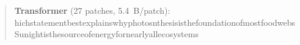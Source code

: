 \begin{quote}\footnotesize\ttfamily\raggedright\setlength{\emergencystretch}{3em}
\textbf{Transformer} (27 patches, 5.4~B/patch):\\[1pt]
\allowbreak{}h\allowbreak{}i\allowbreak{}c\allowbreak{}h\allowbreak{}\bb{\textvisiblespace{}}\allowbreak{}s\allowbreak{}t\allowbreak{}a\allowbreak{}t\allowbreak{}e\allowbreak{}m\allowbreak{}e\allowbreak{}n\allowbreak{}t\allowbreak{}\bb{\textvisiblespace{}}\allowbreak{}b\allowbreak{}e\allowbreak{}s\allowbreak{}t\allowbreak{}\bb{\textvisiblespace{}}\allowbreak{}e\allowbreak{}x\allowbreak{}p\allowbreak{}l\allowbreak{}a\allowbreak{}i\allowbreak{}n\allowbreak{}s\allowbreak{}\bb{\textvisiblespace{}}\allowbreak{}w\allowbreak{}h\allowbreak{}y\allowbreak{}\bb{\textvisiblespace{}}\allowbreak{}p\allowbreak{}h\allowbreak{}o\allowbreak{}t\allowbreak{}o\allowbreak{}s\allowbreak{}\allowbreak{}n\allowbreak{}t\allowbreak{}h\allowbreak{}e\allowbreak{}s\allowbreak{}i\allowbreak{}s\allowbreak{}\bb{\textvisiblespace{}}\allowbreak{}i\allowbreak{}s\allowbreak{}\bb{\textvisiblespace{}}\allowbreak{}t\allowbreak{}h\allowbreak{}e\allowbreak{}\bb{\textvisiblespace{}}\allowbreak{}f\allowbreak{}o\allowbreak{}u\allowbreak{}n\allowbreak{}d\allowbreak{}a\allowbreak{}t\allowbreak{}i\allowbreak{}o\allowbreak{}n\allowbreak{}\bb{\textvisiblespace{}}\allowbreak{}o\allowbreak{}f\allowbreak{}\bb{\textvisiblespace{}}\allowbreak{}m\allowbreak{}o\allowbreak{}s\allowbreak{}t\allowbreak{}\bb{\textvisiblespace{}}\allowbreak{}f\allowbreak{}o\allowbreak{}o\allowbreak{}d\allowbreak{}\bb{\textvisiblespace{}}\allowbreak{}w\allowbreak{}e\allowbreak{}b\allowbreak{}s\allowbreak{}\allowbreak{}\bb{\textvisiblespace{}}\allowbreak{}S\allowbreak{}u\allowbreak{}n\allowbreak{}\allowbreak{}i\allowbreak{}g\allowbreak{}h\allowbreak{}t\allowbreak{}\bb{\textvisiblespace{}}\allowbreak{}i\allowbreak{}s\allowbreak{}\bb{\textvisiblespace{}}\allowbreak{}t\allowbreak{}h\allowbreak{}e\allowbreak{}\bb{\textvisiblespace{}}\allowbreak{}s\allowbreak{}o\allowbreak{}u\allowbreak{}r\allowbreak{}c\allowbreak{}e\allowbreak{}\bb{\textvisiblespace{}}\allowbreak{}o\allowbreak{}f\allowbreak{}\bb{\textvisiblespace{}}\allowbreak{}e\allowbreak{}n\allowbreak{}e\allowbreak{}r\allowbreak{}g\allowbreak{}y\allowbreak{}\bb{\textvisiblespace{}}\allowbreak{}f\allowbreak{}o\allowbreak{}r\allowbreak{}\bb{\textvisiblespace{}}\allowbreak{}n\allowbreak{}e\allowbreak{}a\allowbreak{}r\allowbreak{}l\allowbreak{}y\allowbreak{}\bb{\textvisiblespace{}}\allowbreak{}a\allowbreak{}l\allowbreak{}l\allowbreak{}\bb{\textvisiblespace{}}\allowbreak{}e\allowbreak{}c\allowbreak{}o\allowbreak{}s\allowbreak{}y\allowbreak{}s\allowbreak{}t\allowbreak{}e\allowbreak{}m\allowbreak{}s\allowbreak{}\allowbreak{}\\[6pt]

\end{quote}
